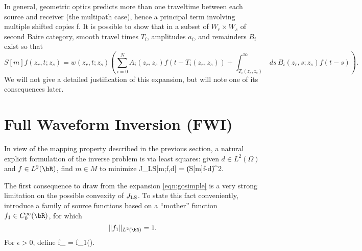 \begin{rem}
\label{rem:multipath}
In general, geometric optics predicts more than one traveltime between
each source and receiver (the multipath case), hence a principal term
involving multiple shifted copies f. It is possible to show that in a
subset of $W_r \times W_s$ of second Baire category, smooth travel times
$T_i$, amplitudes $a_i$, and remainders $B_i$ exist so that
\begin{equation}
\label{eqn:gomultipath} 
S[m]f (z_r,t;z_s) = w(z_r,t;z_s)\left(\sum_{i=0}^NA_i(z_r,z_s)f(t-T_i(z_r,z_s)) + \int_{T_i(z_r,z_s)}^{\infty} 
\,ds\,B_i(z_r,s;z_s)f(t-s)\right). 
\end{equation}
We will not give a detailed justification of this expansion, but will
note one of its consequences later.
\end{rem}

\section{Full Waveform Inversion (FWI)}

In view of the mapping property described in the previous section, a
natural explicit formulation of the inverse problem is via least
squares: given $d\in L^2(\Omega)$ and $f\in L^2(\bR)$, find $m \in M$ to minimize 
\be\label{eqn:ls}
 J_{\rm LS}[m;f,d] =
\|(S[m]f-d)\|^2.  
\ee 

The first consequence to draw from the expansion \ref{eqn:gosimple}
is a very strong limitation on the possible convexity of $J_{\rm
  LS}$. To state this fact conveniently, introduce a family of source
functions based on a ``mother'' function $f_1 \in
C^{\infty}_0(\bR)$, for which
\begin{equation}
\label{eqn:mutha}
\|f_1\|_{L^2(\bR)} = 1.
\end{equation}
For $\epsilon>0$, define
\be\label{eqn:srcfam}
f_{\epsilon} =
f_1\left(\right).
\ee

